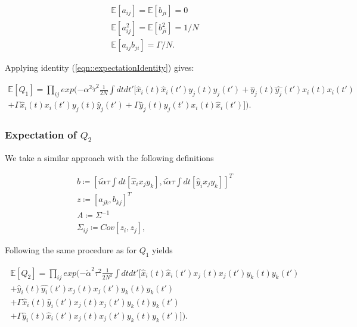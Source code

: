 \documentclass{article}
\begin{document}
	\begin{equation*}
		\begin{split}
			\mathbb{E}[a_{ij}] = \mathbb{E}[b_{ji}] = 0\\
			\mathbb{E}[a_{ij}^2] = \mathbb{E}[b_{ji}^2] = 1/N\\
			\mathbb{E}[a_{ij} b_{ji}] = \Gamma /N.
		\end{split}
	\end{equation*}

	Applying identity (\ref{eqn::expectationIdentity}) gives:

	\begin{equation}
	\begin{split}
		\mathbb{E}[Q_1] = \prod_{ij} exp(- \alpha^2 \tilde{\tau}^2 \frac{1}{2N} \int dt dt'[
		\hat{x}_i
		(t) \hat{x}_i
		(t') y_j(t) y_j(t') + \hat{y}_j(t) \hat{y_j}(t') x_i(t) x_i(t') \\ + \Gamma \hat{x}_i(t) 
		{x}_i
		(t') {y}_j(t) \hat{y}_j(t') + \Gamma \hat{y}_j(t) {y}_j(t') {x}_i(t) \hat{x}_i(t')]).
	\end{split}
	\end{equation}


	\subsubsection{Expectation of $Q_2$} %
	\label{ssub:expectation_of_Q2}
	
	We take a similar approach with the following definitions

	\begin{equation*}
		\begin{split}
			b \coloneqq [i \tilde{\alpha} \tau \int dt[\hat{x}_i x_j y_k], i \tilde{\alpha} 
			\tau
			\int
			dt[\hat{y}_i x_j y_k]]^T \\
			z \coloneqq [a_{jk}, b_{kj}]^T\\
			A \coloneqq \Sigma^{-1}\\
			\Sigma_{ij} \coloneqq Cov[z_i, z_j],
		\end{split}
	\end{equation*}


	Following the same procedure as for $Q_1$ yields

	\begin{equation}
	\begin{split}
		\mathbb{E}[Q_2] = \prod_{ij} exp(- \tilde{\alpha}^2 \tau^2 \frac{1}{2N^2} \int dt dt'[
		\hat{x}_i
		(t) \hat{x}_i
		(t') x_j(t) x_j(t') y_k(t) y_k(t') \\+ \hat{y}_i(t) \hat{y_i}(t') x_j(t) x_j(t') y_k(t)
		y_k(t') \\ + \Gamma \hat{x}_i(t) \hat{y}_i(t')
		{x}_j
		(t) x_j{(t')} {y}_k(t) y_k(t') \\ + \Gamma \hat{y}_i(t) \hat{x}_i(t') {x}_j(t) {x}_j(t')
		y_k(t) y_k(t')]).
	\end{split}
	\end{equation}
\end{document}
